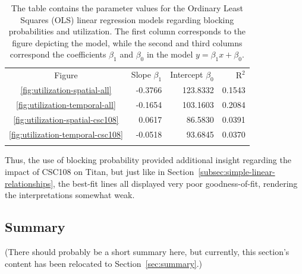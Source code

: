 \begin{table}
\caption{The table contains the parameter values for the Ordinary Least Squares
(OLS) linear regression models regarding blocking probabilities and utilization.
The first column corresponds to the figure depicting the model, while the
second and third columns correspond the coefficients $\beta_1$ and $\beta_0$ in
the model $y = \beta_{1}x + \beta_0$.}
\label{tab:blocking-utilization-params}       %
\begin{tabular}{crrr}
\hline\noalign{\smallskip}
Figure  & Slope $\beta_1$ & Intercept $\beta_0$     & $\text{R}^2$ \\
\noalign{\smallskip}\hline\noalign{\smallskip}
\ref{fig:utilization-spatial-all}       &   -0.3766 &   123.8332 & 0.1543 \\
\ref{fig:utilization-temporal-all}    &     -0.1654 &   103.1603 & 0.2084 \\
\ref{fig:utilization-spatial-csc108}  &      0.0617 &    86.5830 & 0.0391 \\
\ref{fig:utilization-temporal-csc108} &     -0.0518 &    93.6845 & 0.0370 \\
\noalign{\smallskip}\hline
\end{tabular}
\end{table}

Thus, the use of blocking probability provided additional insight regarding the
impact of CSC108 on Titan, but just like in
Section~\ref{subsec:simple-linear-relationships}, the best-fit lines all
displayed very poor goodness-of-fit, rendering the interpretations somewhat
weak.

\subsection{Summary}
\label{subsec:performance-summary}

(There should probably be a short summary here, but currently, this section's
content has been relocated to Section~\ref{sec:summary}.)

